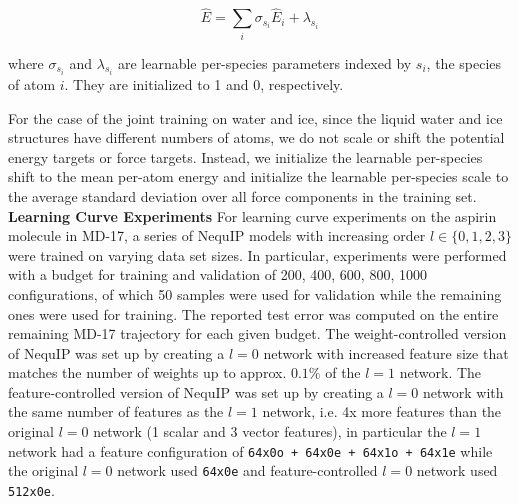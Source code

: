\documentclass[%
reprint,
superscriptaddress,
nofootinbib,
amsmath,amssymb,
aps,
prl,
]{revtex4-1}
\begin{document}
\begin{equation}
    \hat{E} = \sum_{i}{\sigma_{s_i}\hat{E}_{i} + \lambda_{s_i}}
\end{equation}

where $\sigma_{s_i}$ and $\lambda_{s_i}$ are learnable per-species parameters indexed by $s_i$, the species of atom $i$. They are initialized to 1 and 0, respectively. 

For the case of the joint training on water and ice, since the liquid water and ice structures have different numbers of atoms, we do not scale or shift the potential energy targets or force targets. Instead, we initialize the learnable per-species shift to the mean per-atom energy and initialize the learnable per-species scale to the average standard deviation over all force components in the training set.\\ 

\textbf{Learning Curve Experiments} For learning curve experiments on the aspirin molecule in MD-17, a series of NequIP models with increasing order $l \in \{0, 1, 2, 3\}$ were trained on varying data set sizes. In particular, experiments were performed with a budget for training and validation of 200, 400, 600, 800, 1000 configurations, of which 50 samples were used for validation while the remaining ones were used for training. The reported test error was computed on the entire remaining MD-17 trajectory for each given budget. The weight-controlled version of NequIP was set up by creating a $l=0$ network with increased feature size that matches the number of weights up to approx. $0.1\%$ of the $l=1$ network. The feature-controlled version of NequIP was set up by creating a $l=0$ network with the same number of features as the $l=1$ network, i.e. 4x more features than the original $l=0$ network (1 scalar and 3 vector features), in particular the $l=1$ network had a feature configuration of \texttt{64x0o + 64x0e + 64x1o + 64x1e} while the original $l=0$ network used \texttt{64x0e} and feature-controlled $l=0$ network used \texttt{512x0e}.\\
\end{document}
